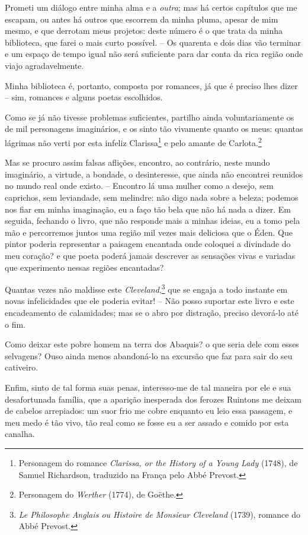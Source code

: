  Prometi um diálogo entre minha alma e a \textit{outra}; mas há certos
capítulos que me escapam, ou antes há outros que escorrem da minha
pluma, apesar de mim mesmo, e que derrotam meus projetos: deste número
é o que trata da minha biblioteca, que farei o mais curto possível. --
Os quarenta e dois dias vão terminar e um espaço de tempo igual não
será suficiente para dar conta da rica região onde viajo
agradavelmente.

 Minha biblioteca é, portanto, composta por romances, já que é preciso
lhes dizer -- sim, romances e alguns poetas escolhidos.

 Como se já não tivesse problemas suficientes, partilho ainda
voluntariamente os de mil personagens imaginários, e os sinto tão
vivamente quanto os meus: quantas lágrimas não verti por esta infeliz
Clarissa\footnote{ Personagem do romance \textit{Clarissa, or the
History of a Young Lady} (1748), de Samuel Richardson, traduzido na
França pelo Abbé Prevost.} e pelo amante de Carlota.\footnote{ Personagem 
do \textit{Werther} (1774), de Goëthe.}

 Mas se procuro assim falsas aflições, encontro, ao contrário, neste
mundo imaginário, a virtude, a bondade, o desinteresse, que ainda não
encontrei reunidos no mundo real onde existo. -- Encontro lá uma
mulher como a desejo, sem caprichos, sem leviandade, sem melindre: não
digo nada sobre a beleza; podemos nos fiar em minha imaginação, eu a
faço tão bela que não há nada a dizer. Em seguida, fechando o livro,
que não responde mais a minhas ideias, eu a tomo pela mão e percorremos
juntos uma região mil vezes mais deliciosa que o Éden. Que pintor
poderia representar a paisagem encantada onde coloquei a divindade do
meu coração? e que poeta poderá jamais descrever as sensações vivas e
variadas que experimento nessas regiões encantadas?

 Quantas vezes não maldisse este \textit{Cleveland},\footnote{ \textit{Le
Philosophe Anglais ou Histoire de Monsieur Cleveland} (1739), romance
do Abbé Prevost.} que se engaja a todo instante em novas
infelicidades que ele poderia evitar! -- Não posso suportar este livro
e este encadeamento de calamidades; mas se o abro por distração,
preciso devorá-lo até o fim.

 Como deixar este pobre homem na terra dos Abaquis? o que seria dele com
esses selvagens? Ouso ainda menos abandoná-lo na excursão que faz para
sair do seu cativeiro.

 Enfim, sinto de tal forma suas penas, interesso-me de tal maneira por
ele e sua desafortunada família, que a aparição inesperada dos ferozes
Ruintons me deixam de cabelos arrepiados: um suor frio me cobre
enquanto eu leio essa passagem, e meu medo é tão vivo, tão real como se
fosse eu a ser assado e comido por esta canalha.

